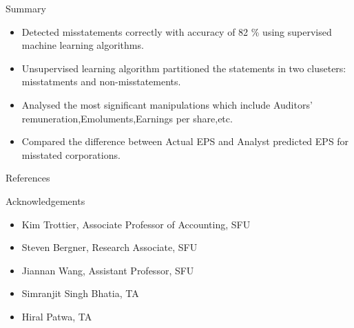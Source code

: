 \documentclass[final]{beamer}
\newlength{\onecolwid}
\begin{document}
\begin{frame}[t]
\begin{columns}[t]
\begin{column}{\onecolwid}
\begin{alertblock}{Summary} 


\begin{itemize}
\item Detected misstatements correctly with accuracy of 82 \% using supervised machine learning algorithms.
\item Unsupervised learning algorithm partitioned the statements in two cluseters: misstatments and non-misstatements.
\item Analysed the most significant manipulations which include Auditors' remuneration,Emoluments,Earnings per share,etc.
\item Compared the difference between Actual EPS and Analyst predicted EPS for misstated corporations.
\end{itemize}




\end{alertblock}

\begin{block}{References}
\nocite{*} %
\small{
\vspace{0.75in}}
\end{block}

\begin{block}{Acknowledgements}
\small{
\begin{itemize}
\item Kim Trottier, Associate Professor of Accounting, SFU
\item Steven Bergner, Research Associate, SFU
\item Jiannan Wang, Assistant Professor, SFU
\item Simranjit Singh Bhatia, TA
\item Hiral Patwa, TA
\end{itemize}
}
\end{block}




\end{column}
\end{columns}
\end{frame}
\end{document}
